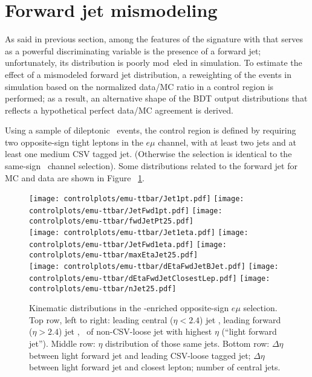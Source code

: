 \section{Forward jet mismodeling}

\label{sec:forward_jet_model}

As said in previous section, among the features of the \tHq signature with that serves as a powerful discriminating variable is the presence of a forward jet; unfortunately, its \etac distribution is poorly mod\
eled in simulation. To estimate the effect of a mismodeled forward jet distribution, a reweighting of the events in simulation based on the normalized data/MC ratio in a control region is performed; as a result, an alternative shape of the BDT output distributions that reflects a hypothetical perfect data/MC agreement is derived.

Using a sample of dileptonic \ttbar\ events, the control region is defined by requiring two opposite-sign tight leptons in the $e\mu$ channel, with at least two jets and at least one medium CSV tagged jet. (Otherwise the selection is identical to the same-sign \emu\ channel selection). Some distributions related to the forward jet for MC and data are shown in Figure ~\ref{fig:osemu-ttbar}.

\begin{figure} [!h]
  \centering
  \texttt{[image: controlplots/emu-ttbar/Jet1pt.pdf]}
  \texttt{[image: controlplots/emu-ttbar/JetFwd1pt.pdf]}
  \texttt{[image: controlplots/emu-ttbar/fwdJetPt25.pdf]} \\
  \texttt{[image: controlplots/emu-ttbar/Jet1eta.pdf]}
  \texttt{[image: controlplots/emu-ttbar/JetFwd1eta.pdf]}
  \texttt{[image: controlplots/emu-ttbar/maxEtaJet25.pdf]} \\
  \texttt{[image: controlplots/emu-ttbar/dEtaFwdJetBJet.pdf]}
  \texttt{[image: controlplots/emu-ttbar/dEtaFwdJetClosestLep.pdf]}
  \texttt{[image: controlplots/emu-ttbar/nJet25.pdf]} \\
\caption[Kinematic distributions for forward jet mismodeling study.]{Kinematic distributions in the \ttbar-enriched opposite-sign $e\mu$ selection. Top row, left to right: leading central ($\eta<2.4$) jet \pt, leading forward ($\eta>2.4$) jet \pt, \pt\ of non-CSV-loose jet with highest $\eta$ (``light forward jet''). Middle row: $\eta$ distribution of those same jets. Bottom row: $\Delta\eta$ between light forward jet and leading CSV-loose tagged jet; $\Delta\eta$ between light forward jet and closest lepton; number of central jets.}
\label{fig:osemu-ttbar}
\end{figure}

